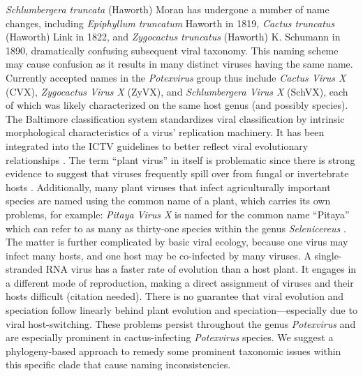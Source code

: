 \documentclass[fleqn,10pt,lineno]{wlpeerj}
\begin{document}
\textit{Schlumbergera truncata} (Haworth) Moran has undergone a number of name changes, including \textit{Epiphyllum truncatum} Haworth in 1819, \textit{Cactus truncatus} (Haworth) Link in 1822, and \textit{Zygocactus truncatus} (Haworth) K. Schumann in 1890, dramatically confusing subsequent viral taxonomy.
This naming scheme may cause confusion as it results in many distinct viruses having the same name.
Currently accepted names in the \textit{Potexvirus} group thus include \textit{Cactus Virus X} (CVX), \textit{Zygocactus Virus X} (ZyVX), and \textit{Schlumbergera Virus X} (SchVX), each of which was likely characterized on the same host genus (and possibly species). %
The Baltimore classification system standardizes viral classification by intrinsic morphological characteristics of a virus' replication machinery. 
It has been integrated into the ICTV guidelines to better reflect viral evolutionary relationships \citep{ictv2020}.
The term ``plant virus'' in itself is problematic since there is strong evidence to suggest that viruses frequently spill over from fungal or invertebrate hosts \citep{lefeuvre_evolution_2019}. %
Additionally, many plant viruses that infect agriculturally important species are named using the common name of a plant, which carries its own problems, for example: \textit{Pitaya Virus X} is named for the common name ``Pitaya'' which can refer to as many as thirty-one species within the genus \textit{Selenicereus} \citep{korotkova_phylogenetic_2017,guerrero_phylogenetic_2019,le_bellec_12_2011}. 
The matter is further complicated by basic viral ecology, because one virus may infect many hosts, and one host may be co-infected by many viruses. 
A single-stranded RNA virus has a faster rate of evolution than a host plant. %
It engages in a different mode of reproduction, making a direct assignment of viruses and their hosts difficult (citation needed).%
There is no guarantee that viral evolution and speciation follow linearly behind plant evolution and speciation---especially due to viral host-switching.
These problems persist throughout the genus \textit{Potexvirus} and are especially prominent in cactus-infecting \textit{Potexvirus} species.
We suggest a phylogeny-based approach to remedy some prominent taxonomic issues within this specific clade that cause naming inconsistencies.
\end{document}
